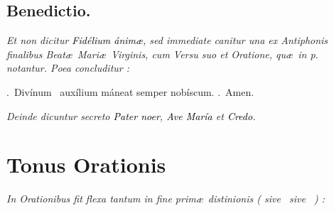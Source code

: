 \documentclass[12pt]{article} %
\newenvironment{rubric}{\vspace{2 mm}\color{benred8} \itshape \leftskip 0in \setlength{\parindent}{0.25in}}{\vspace{2 mm}}
\newenvironment{response}{\leftskip 0in \setlength{\parindent}{0in}}{\vspace{2 mm}}
\let\oldgresixstar\gresixstar
\renewcommand{\gresixstar}{\textcolor{benred8}{\oldgresixstar}}
\let\oldgredagger\gredagger
\renewcommand{\gredagger}{\textcolor{benred8}{\oldgredagger}}
\let\oldVbar\Vbar
\renewcommand{\Vbar}{\textcolor{benred8}{\oldVbar .}}
\let\oldRbar\Rbar
\renewcommand{\Rbar}{\textcolor{benred8}{\oldRbar .}}
\let\oldgrealtcross\grealtcross
\renewcommand{\grealtcross}{\textcolor{benred8}{\oldgrealtcross}}
\begin{document}
\vspace{1.5mm}

\subsection*{Benedictio.}

\gresetfirstlineaboveinitial{\small \textsc{ \textbf{\textcolor{benred8}{}}}}{\small \textsc{ \textbf{\textcolor{benred8}{}}}}

\vspace{1.5mm}

\begin{rubric}
Et non dicitur \textcolor{black}{\emph{Fid\'{e}lium \'{a}nim\ae}}, sed immediate canitur una ex Antiphonis finalibus Beat\ae\ Mari\ae\ Virginis, cum Versu suo et Oratione, qu\ae\ in p.~\pageref{sec:AntBMV} notantur. Poea concluditur :

\end{rubric}

\begin{response}
\Vbar\ Div\'{i}num \grealtcross\ aux\'{i}lium m\'{a}neat semper nob\'{i}scum. \Rbar\ Amen.

\end{response}

\begin{rubric}
Deinde dicuntur secreto \textcolor{black}{\emph{Pater noer}}, \textcolor{black}{\emph{Ave Mar\'{i}a}} et \textcolor{black}{\emph{Credo}}.

\end{rubric}

\newpage


\section*{Tonus Orationis}
\label{sec:TonusOrationis}

\thispagestyle{plain}



\vspace{1mm}

\begin{rubric}
In Orationibus fit flexa tantum in fine prim\ae\ distinionis ( sive \gredagger\ sive \gresixstar\ ) :

\end{rubric}
\end{document}
